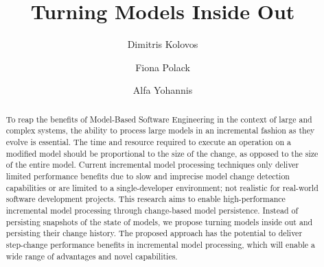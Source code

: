 \documentclass{llncs}
\begin{document}
\renewcommand{\thelstlisting}{\arabic{lstlisting}}
\renewcommand{\labelitemi}{$\bullet$}

\title{Turning Models Inside Out}
%
%
\author{Dimitris Kolovos \and Fiona Polack \and Alfa Yohannis}
%
%
%

\maketitle              %

\begin{abstract}
To reap the benefits of Model-Based Software Engineering in the context of large and complex systems, the ability to process large models in an incremental fashion as they evolve is essential. The time and resource required to execute an operation on a modified model should be proportional to the size of the change, as opposed to the size of the entire model. Current incremental model processing techniques only deliver limited performance benefits due to slow and imprecise model change detection capabilities or are limited to a single-developer environment; not realistic for real-world software development projects. This research aims to enable high-performance incremental model processing through change-based model persistence. Instead of persisting snapshots of the state of models, we propose turning models inside out and persisting their change history. The proposed approach has the potential to deliver step-change performance benefits in incremental model processing, which will enable a wide range of advantages and novel capabilities.
\end{abstract}
\end{document}
